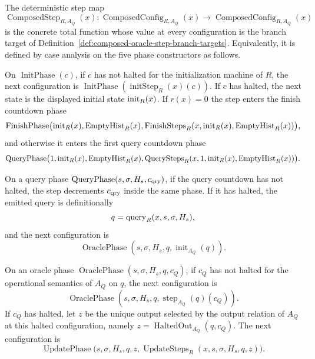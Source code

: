 \begin{definition}
  \label{def:composed-oracle-step-map}
  The deterministic step map
  \[
    \operatorname{ComposedStep}_{R,A_Q}(x):
      \operatorname{ComposedConfig}_{R,A_Q}(x)\to
      \operatorname{ComposedConfig}_{R,A_Q}(x)
  \]
  is the concrete total function whose value at every configuration is the
  branch target of
  Definition~\ref{def:composed-oracle-step-branch-targets}.  Equivalently, it
  is defined by case analysis on the five phase constructors as follows.

  On $\operatorname{InitPhase}(c)$, if $c$ has not halted for the initialization
  machine of $R$, the next configuration is
  $\operatorname{InitPhase}(\operatorname{initStep}_R(x)(c))$.  If $c$ has
  halted, the next state is the displayed initial state $\operatorname{init}_R(x)$.  If
  $r(x)=0$ the step enters the finish countdown phase
  \[
    \operatorname{FinishPhase}
      \bigl(\operatorname{init}_R(x),\operatorname{EmptyHist}_R(x),
        \operatorname{FinishSteps}_R
          (x,\operatorname{init}_R(x),\operatorname{EmptyHist}_R(x))\bigr),
  \]
  and otherwise it enters the first query countdown phase
  \[
    \operatorname{QueryPhase}
      \bigl(1,\operatorname{init}_R(x),\operatorname{EmptyHist}_R(x),
        \operatorname{QuerySteps}_R
          (x,1,\operatorname{init}_R(x),\operatorname{EmptyHist}_R(x))\bigr).
  \]

  On a query phase
  $\operatorname{QueryPhase}(s,\sigma,H_s,c_{\rm qry})$, if the query countdown
  has not halted, the step decrements $c_{\rm qry}$ inside the same phase.  If
  it has halted, the emitted query is definitionally
  \[
    q=\operatorname{query}_R(x,s,\sigma,H_s),
  \]
  and the next configuration is
  \[
    \operatorname{OraclePhase}(s,\sigma,H_s,q,\operatorname{init}_{A_Q}(q)).
  \]

  On an oracle phase
  $\operatorname{OraclePhase}(s,\sigma,H_s,q,c_Q)$, if $c_Q$ has not halted for
  the operational semantics of $A_Q$ on $q$, the next configuration is
  \[
    \operatorname{OraclePhase}
      (s,\sigma,H_s,q,\operatorname{step}_{A_Q}(q)(c_Q)).
  \]
  If $c_Q$ has halted, let $z$ be the unique output selected by the output
  relation of $A_Q$ at this halted configuration, namely
  $z=\operatorname{HaltedOut}_{A_Q}(q,c_Q)$.  The next configuration is
  \[
    \operatorname{UpdatePhase}
      \bigl(s,\sigma,H_s,q,z,
        \operatorname{UpdateSteps}_R(x,s,\sigma,H_s,q,z)\bigr).
  \]


\end{definition}
